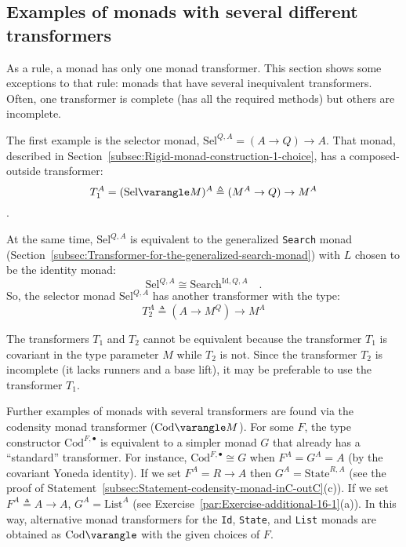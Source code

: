 \subsection{Examples of monads with several different transformers\label{subsec:Examples-of-monads-with-two-different-transformers}}

As a rule, a monad has only one monad transformer. This section shows
some exceptions to that rule: monads that have several inequivalent
transformers. Often, one transformer is complete (has all the required
methods) but others are incomplete.

The first example is the selector monad,
$\text{Sel}^{Q,A}=(A\rightarrow Q)\rightarrow A$. That monad, described
in Section~\ref{subsec:Rigid-monad-construction-1-choice}, has a
composed-outside transformer: 
\[
T_{1}^{A}=(\text{Sel}\varangle M)^{A}\triangleq(M^{A}\rightarrow Q)\rightarrow M^{A}
\]
. 

At the same time, $\text{Sel}^{Q,A}$ is equivalent to the generalized
\lstinline!Search! monad (Section~\ref{subsec:Transformer-for-the-generalized-search-monad})
with $L$ chosen to be the identity monad:
\[
\text{Sel}^{Q,A}\cong\text{Search}^{\text{Id},Q,A}\quad.
\]
So, the selector monad $\text{Sel}^{Q,A}$ has another transformer
with the type: 
\[
T_{2}^{A}\triangleq(A\rightarrow M^{Q})\rightarrow M^{A}
\]

The transformers $T_{1}$ and $T_{2}$ cannot be equivalent because
the transformer $T_{1}$ is covariant in the type parameter $M$ while
$T_{2}$ is not. Since the transformer $T_{2}$ is incomplete (it
lacks runners and a base lift), it may be preferable to use the transformer
$T_{1}$.

Further examples of monads with several transformers are found via
the codensity monad transformer ($\text{Cod}\varangle M$). For some
$F$, the type constructor $\text{Cod}^{F,\bullet}$ is equivalent
to a simpler monad $G$ that already has a \textsf{``}standard\textsf{''} transformer.
For instance, $\text{Cod}^{F,\bullet}\cong G$ when $F^{A}=G^{A}=A$
(by the covariant Yoneda identity). If we set $F^{A}=R\rightarrow A$
then $G^{A}=\text{State}^{R,A}$ (see the proof of Statement~\ref{subsec:Statement-codensity-monad-inC-outC}(c)).
If we set $F^{A}\triangleq A\rightarrow A$, $G^{A}=\text{List}^{A}$
(see Exercise~\ref{par:Exercise-additional-16-1}(a)). In this way,
alternative monad transformers for the \lstinline!Id!, \lstinline!State!,
and \lstinline!List! monads are obtained as $\text{Cod}\varangle$
with the given choices of $F$. 

